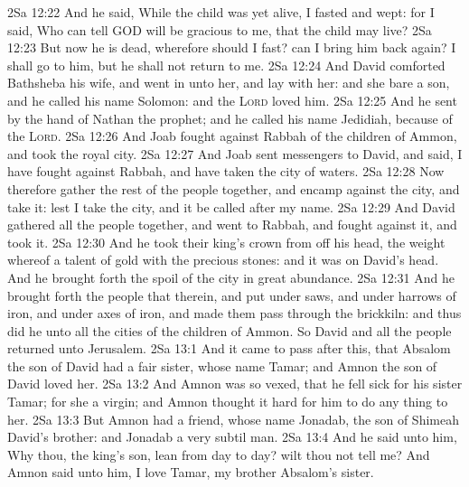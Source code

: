 \vs 2Sa 12:22 And he said, While the child was yet alive, I fasted and wept: for I said, Who can tell  GOD will be gracious to me, that the child may live?
\vs 2Sa 12:23 But now he is dead, wherefore should I fast? can I bring him back again? I shall go to him, but he shall not return to me.
\vs 2Sa 12:24 And David comforted Bathsheba his wife, and went in unto her, and lay with her: and she bare a son, and he called his name Solomon: and the \textsc{Lord} loved him.
\vs 2Sa 12:25 And he sent by the hand of Nathan the prophet; and he called his name Jedidiah, because of the \textsc{Lord}.
\vs 2Sa 12:26 And Joab fought against Rabbah of the children of Ammon, and took the royal city.
\vs 2Sa 12:27 And Joab sent messengers to David, and said, I have fought against Rabbah, and have taken the city of waters.
\vs 2Sa 12:28 Now therefore gather the rest of the people together, and encamp against the city, and take it: lest I take the city, and it be called after my name.
\vs 2Sa 12:29 And David gathered all the people together, and went to Rabbah, and fought against it, and took it.
\vs 2Sa 12:30 And he took their king's crown from off his head, the weight whereof  a talent of gold with the precious stones: and it was  on David's head. And he brought forth the spoil of the city in great abundance.
\vs 2Sa 12:31 And he brought forth the people that  therein, and put  under saws, and under harrows of iron, and under axes of iron, and made them pass through the brickkiln: and thus did he unto all the cities of the children of Ammon. So David and all the people returned unto Jerusalem.
\vs 2Sa 13:1 And it came to pass after this, that Absalom the son of David had a fair sister, whose name  Tamar; and Amnon the son of David loved her.
\vs 2Sa 13:2 And Amnon was so vexed, that he fell sick for his sister Tamar; for she  a virgin; and Amnon thought it hard for him to do any thing to her.
\vs 2Sa 13:3 But Amnon had a friend, whose name  Jonadab, the son of Shimeah David's brother: and Jonadab  a very subtil man.
\vs 2Sa 13:4 And he said unto him, Why  thou,  the king's son, lean from day to day? wilt thou not tell me? And Amnon said unto him, I love Tamar, my brother Absalom's sister.
